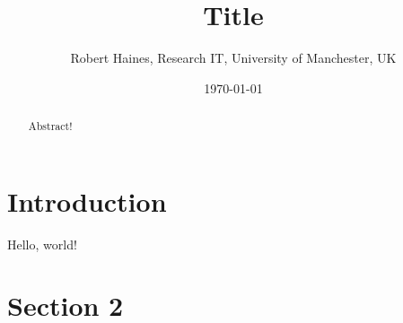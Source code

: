 \documentclass[11pt,a4paper]{article}
\begin{document}
\title{Title}
\author{Robert Haines, Research IT, University of Manchester, UK}
\date{\today}
\maketitle

\begin{abstract}
Abstract!
\end{abstract}

\section{Introduction}

Hello, world!

\section{Section 2}
\end{document}
